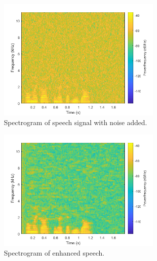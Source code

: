 \documentclass[letterpaper]{article}
\begin{document}
\begin{figure}[h!]
    \centering
    \includegraphics[width=8cm]{ee599hw5p4-2.png}
    \caption{Spectrogram of speech signal with noise added.}
    \label{fig:p4noise}
\end{figure}

\begin{figure}[h!]
    \centering
    \includegraphics[width=8cm]{ee599hw5p4-3.png}
    \caption{Spectrogram of enhanced speech.}
    \label{fig:p4enhan}
\end{figure}

\newpage



\end{document}

